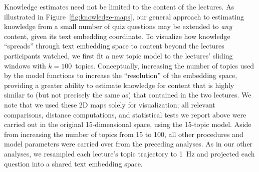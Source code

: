 \documentclass[10pt]{article}
\begin{document}
Knowledge estimates need not be limited to the content of the lectures. As
illustrated in Figure~\ref{fig:knowledge-maps}, our general approach to
estimating knowledge from a small number of quiz questions may be extended to
\textit{any} content, given its text embedding coordinate. To visualize how
knowledge ``spreads'' through text embedding space to content beyond the
lectures participants watched, we first fit a new topic model to the lectures'
sliding windows with $k = 100$~topics. Conceptually, increasing the
number of topics used by the model functions to increase the ``resolution'' of
the embedding space, providing a greater ability to estimate knowledge for
content that is highly similar to (but not precisely the same as) that
contained in the two lectures. We note that we used these 2D maps solely for
visualization; all relevant comparisons, distance computations, and statistical
tests we report above were carried out in the original 15-dimensional space,
using the 15-topic model. Aside from increasing the number of topics from 15 to
100, all other procedures and model parameters were carried over from the
preceding analyses. As in our other analyses, we resampled each lecture's topic
trajectory to 1~Hz and projected each question into a shared text embedding
space.
\end{document}
